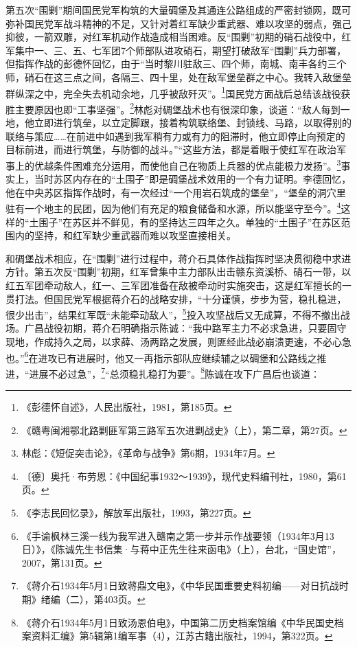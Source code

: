 第五次“围剿”期间国民党军构筑的大量碉堡及其通连公路组成的严密封锁网，既可弥补国民党军战斗精神的不足，又针对着红军缺少重武器、难以攻坚的弱点，强己抑彼，一箭双雕，对红军机动作战造成相当困难。反“围剿”初期的硝石战役中，红军集中一、三、五、七军团7个师部队进攻硝石，期望打破敌军“围剿”兵力部署，但指挥作战的彭德怀回忆，由于“当时黎川驻敌三、四个师，南城、南丰各约三个师，硝石在这三点之间，各隔三、四十里，处在敌军堡垒群之中心。我转入敌堡垒群纵深之中，完全失去机动余地，几乎被敌歼灭”。\footnote{《彭德怀自述》，人民出版社，1981，第185页。}国民党方面战后总结该战役获胜主要原因也即“工事坚强”。\footnote{《赣粤闽湘鄂北路剿匪军第三路军五次进剿战史》（上），第二章，第27页。}林彪对碉堡战术也有很深印象，谈道：“敌人每到一地，他立即进行筑垒，以立定脚跟，接着构筑联络堡、封锁线、马路，以取得别的联络与策应……在前进中如遇到我军稍有力或有力的阻滞时，他立即停止向预定的目标前进，而进行筑堡，与防御的战斗。”“这些方法，都是着眼于使红军在政治军事上的优越条件困难充分运用，而使他自己在物质上兵器的优点能极力发扬”。\footnote{林彪：《短促突击论》，《革命与战争》第6期，1934年7月。}事实上，当时苏区内存在的“土围子”即是碉堡战术效用的一个有力证明。李德回忆，他在中央苏区指挥作战时，有一次经过“一个用岩石筑成的堡垒”，“堡垒的洞穴里驻有一个地主的民团，因为他们有充足的粮食储备和水源，所以能坚守至今”。\footnote{〔德〕奥托·布劳恩：《中国纪事1932～1939》，现代史料编刊社，1980，第61页。}这样的“土围子”在苏区并不鲜见，有的坚持达三四年之久。单独的“土围子”在苏区范围内的坚持，和红军缺少重武器而难以攻坚直接相关。


和碉堡战术相应，在“围剿”进行过程中，蒋介石具体作战指挥时坚决贯彻稳中求进方针。第五次反“围剿”初期，红军曾集中主力部队出击赣东资溪桥、硝石一带，以红五军团牵动敌人，红一、三军团准备在敌被牵动时实施突击，这是红军擅长的一贯打法。但国民党军根据蒋介石的战略安排，“十分谨慎，步步为营，稳扎稳进，很少出击”，结果红军既“未能牵动敌人”，\footnote{《李志民回忆录》，解放军出版社，1993，第227页。}投入攻坚战后又无成算，不得不撤出战场。广昌战役初期，蒋介石明确指示陈诚：“我中路军主力不必求急进，只要固守现地，作成持久之局，以求薛、汤两路之发展，则匪经此战必崩溃更速，不必心急也。”\footnote{《手谕枫林三溪一线为我军进入赣南之第一步并示作战要领（1934年3月13日）》，《陈诚先生书信集·与蒋中正先生往来函电》（上），台北，“国史馆”，2007，第131页。}在进攻已有进展时，他又一再指示部队应继续辅之以碉堡和公路线之推进，“进展不必过急”，\footnote{《蒋介石1934年5月1日致蒋鼎文电》，《中华民国重要史料初编——对日抗战时期》绪编（二），第403页。}“总须稳扎稳打为要”。\footnote{《蒋介石1934年5月1日致汤恩伯电》，中国第二历史档案馆编《中华民国史档案资料汇编》第5辑第1编军事（4），江苏古籍出版社，1994，第322页。}陈诚在攻下广昌后也谈道：

